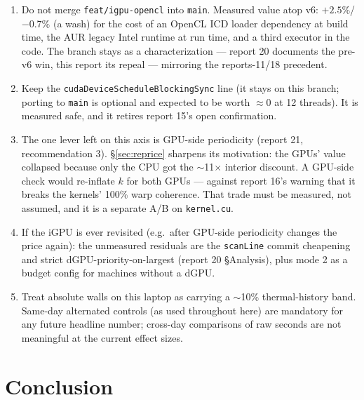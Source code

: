 \documentclass[
	english,
	letterpaper, oneside
]{article}
\begin{document}
\begin{enumerate}
  \item Do not merge \texttt{feat/igpu-opencl} into \texttt{main}.
        Measured value atop v6: $+2.5\%$/$-0.7\%$ (a wash) for the cost of an
        OpenCL ICD loader dependency at build time, the AUR legacy Intel
        runtime at run time, and a third executor in the code. The branch
        stays as a characterization --- report 20 documents the pre-v6 win,
        this report its repeal --- mirroring the reports-11/18 precedent.
  \item Keep the \texttt{cudaDeviceScheduleBlockingSync} line (it
        stays on this branch; porting to \texttt{main} is optional and
        expected to be worth $\approx0$ at 12 threads). It is measured safe,
        and it retires report 15's open confirmation.
  \item The one lever left on this axis is GPU-side periodicity
        (report 21, recommendation 3). \S\ref{sec:reprice} sharpens its
        motivation: the GPUs' value collapsed because only the CPU got the
        $\sim$11$\times$ interior discount. A GPU-side check would re-inflate
        $k$ for both GPUs --- against report 16's warning that it breaks the
        kernels' 100\% warp coherence. That trade must be measured, not
        assumed, and it is a separate A/B on \texttt{kernel.cu}.
  \item If the iGPU is ever revisited (e.g.\ after GPU-side
        periodicity changes the price again): the unmeasured residuals are
        the \texttt{scanLine} commit cheapening and strict
        dGPU-priority-on-largest (report 20 \S Analysis), plus mode 2 as a
        budget config for machines without a dGPU.
  \item Treat absolute walls on this laptop as carrying a
        $\sim$10\% thermal-history band. Same-day alternated controls (as
        used throughout here) are mandatory for any future headline number;
        cross-day comparisons of raw seconds are not meaningful at the
        current effect sizes.
\end{enumerate}

\section{Conclusion}
\end{document}
